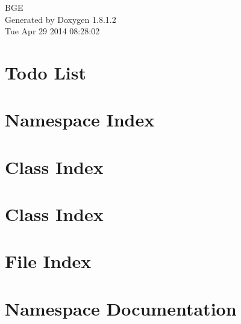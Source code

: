 \documentclass{book}
\begin{document}
\hypersetup{pageanchor=false,citecolor=blue}
\begin{titlepage}
\vspace*{7cm}
\begin{center}
{\Large B\-G\-E }\\
\vspace*{1cm}
{\large Generated by Doxygen 1.8.1.2}\\
\vspace*{0.5cm}
{\small Tue Apr 29 2014 08:28:02}\\
\end{center}
\end{titlepage}
\clearemptydoublepage
{}
\tableofcontents
\clearemptydoublepage
{}
\hypersetup{pageanchor=true,citecolor=blue}
\chapter{Todo List}
\label{todo}
\hypertarget{todo}{}

\chapter{Namespace Index}

\chapter{Class Index}

\chapter{Class Index}

\chapter{File Index}

\chapter{Namespace Documentation}


\end{document}
